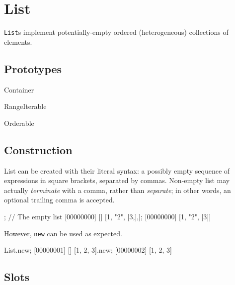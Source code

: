 
\section{List}

\lstinline|List|s implement potentially-empty ordered (heterogeneous)
collections of elements.

\subsection{Prototypes}

\begin{refObjects}
\item[Container]
\item[RangeIterable]
\item[Orderable]
\end{refObjects}

\subsection{Construction}

List can be created with their literal syntax: a possibly empty
sequence of expressions in square brackets, separated by commas.
Non-empty list may actually \emph{terminate} with a comma, rather than
\emph{separate}; in other words, an optional trailing comma is accepted.

\begin{urbiscript}
[]; // The empty list
[00000000] []
[1, "2", [3,],];
[00000000] [1, "2", [3]]
\end{urbiscript}

However, \lstinline|new| can be used as expected.

\begin{urbiscript}
List.new;
[00000001] []
[1, 2, 3].new;
[00000002] [1, 2, 3]
\end{urbiscript}

\subsection{Slots}

